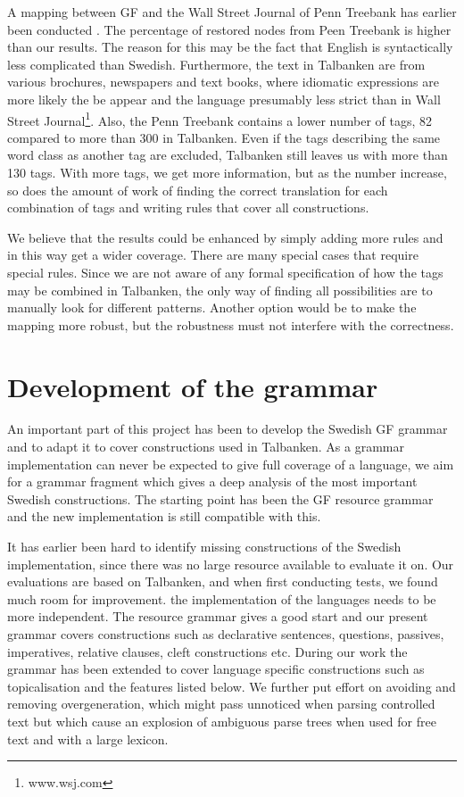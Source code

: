 \documentclass[10pt, a4paper]{article}
\begin{document}
A mapping between GF and the Wall Street Journal of Penn Treebank has earlier
been conducted \cite{gfMech}.
The percentage of restored nodes from Peen Treebank is higher than our results.
The reason for this may be the fact that English is syntactically less complicated
than Swedish.
Furthermore, the text in Talbanken are from various brochures, newspapers and text books,
where idiomatic expressions are more likely the be appear and the language
presumably less strict than in Wall Street Journal\footnote{www.wsj.com}.
Also, the Penn Treebank contains a lower number of tags, 82 compared
to more than 300 in Talbanken. Even if the tags describing the same word
class as another tag are excluded, Talbanken still leaves us with more than 130 tags.
With more tags, we get more information, but as the number 
increase, so does the amount of work of finding the correct translation 
for each combination of tags and writing rules that cover all constructions. 

We believe that the results could be enhanced by simply adding more rules 
and in this way get a wider coverage. There are many special cases that require
special rules. Since we are not aware of any formal specification of how the tags may be
combined in Talbanken, the only way of finding all possibilities are to manually look
for different patterns. Another option would be to make the mapping more
robust, but the robustness must not interfere with the correctness.


\section{Development of the grammar}
\label{sec:grammar}
An important part of this project has been to develop the Swedish GF grammar and
to adapt it to cover constructions used in Talbanken. As a grammar
implementation can never be expected to give
full coverage of a language, we aim for a grammar fragment which gives a deep
analysis of the most important Swedish constructions.
The starting point has been the GF resource grammar and the new implementation is
still compatible with this.

It has earlier been hard to identify missing constructions of the Swedish
implementation, since there was no large resource available to evaluate it on.
Our evaluations are based on Talbanken, and when first conducting tests,
we found much room for improvement.
the implementation of the languages needs to be more independent.
The resource grammar gives a good start and our present grammar 
covers constructions such as declarative sentences, questions, passives,
imperatives, relative clauses, cleft constructions etc.
During our work the grammar has been extended to cover language specific
constructions such as topicalisation and the features listed below. We further
put effort on avoiding and removing overgeneration, which might pass unnoticed
when parsing controlled text but which cause an explosion of ambiguous parse trees
when used for free text and with a large lexicon.
\end{document}
